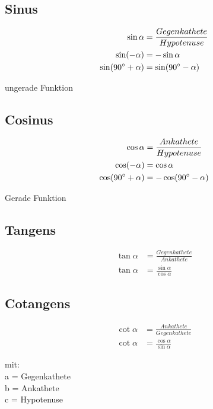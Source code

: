 \begin{sectionbox}
	\subsection{Sinus}
		\begin{emphbox}
			\begin{align*}
			 \sin \alpha &= \frac{Gegenkathete}{Hypotenuse} \\
			 \sin (-\alpha) &= -\sin \alpha \\
			 \sin (90 \degree + \alpha) &= \sin (90 \degree - \alpha)
			\end{align*}
		\end{emphbox}
		ungerade Funktion
	\subsection{Cosinus}
		\begin{emphbox}
			\begin{align*}
			\cos \alpha &= \frac{Ankathete}{Hypotenuse}\\
			\cos (-\alpha) &= \cos \alpha\\
			\cos (90 \degree + \alpha) &= -\cos (90 \degree - \alpha)
			\end{align*}
		\end{emphbox}
		Gerade Funktion

	\subsection{Tangens}
		\begin{emphbox}
			\begin{align*}
			\tan \alpha &= \frac{Gegenkathete}{Ankathete} \\
			\tan \alpha &= \frac{\sin \alpha}{\cos \alpha} 
			\end{align*}
		\end{emphbox}
		
	\subsection{Cotangens}
		\begin{emphbox}
			\begin{align*}
			\cot \alpha &= \frac{Ankathete}{Gegenkathete} \\
			\cot \alpha &= \frac{\cos \alpha}{\sin \alpha} 		
			\end{align*}
		\end{emphbox}
	mit:\\
	a = Gegenkathete\\
	b = Ankathete\\
	c = Hypotenuse


\end{sectionbox}
